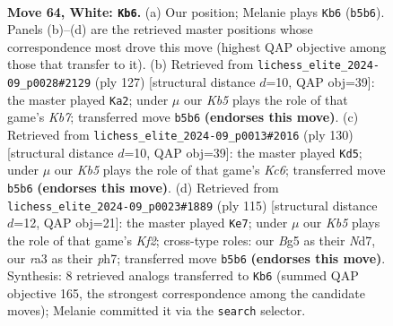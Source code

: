 \documentclass[11pt]{article}
\begin{document}
\clearpage

\begin{figure}[p]\centering
\begin{subfigure}{0.46\textwidth}\centering
\resizebox{\linewidth}{!}{%
\newchessgame
\chessboard[
  setfen={8/8/3k4/1K4Br/4q3/r7/8/8 w - - 0 64},
  showmover=false,
  pgfstyle=straightmove, color=movearrow, markmove={b5-b6}
]}
\caption{}
\end{subfigure}\hfill
\begin{subfigure}{0.46\textwidth}\centering
\resizebox{\linewidth}{!}{%
\newchessgame
\chessboard[
  setfen={8/8/8/8/1R6/1b6/1k1K4/8 b - - 1 64},
  showmover=false,
  pgfstyle=straightmove, color=movearrow, markmove={b2-a2}
]}
\caption{}
\end{subfigure}
\\[4pt]
\begin{subfigure}{0.46\textwidth}\centering
\resizebox{\linewidth}{!}{%
\newchessgame
\chessboard[
  setfen={3k4/7R/2KBr3/8/8/8/8/8 w - - 18 66},
  showmover=false,
  pgfstyle=straightmove, color=movearrow, markmove={c6-d5}
]}
\caption{}
\end{subfigure}\hfill
\begin{subfigure}{0.46\textwidth}\centering
\resizebox{\linewidth}{!}{%
\newchessgame
\chessboard[
  setfen={8/1R1n1k1P/8/5K2/8/8/8/b7 b - - 6 58},
  showmover=false,
  pgfstyle=straightmove, color=movearrow, markmove={f7-e7}
]}
\caption{}
\end{subfigure}
\caption{\textbf{Move 64, White: \texttt{Kb6}.} (a) Our position; Melanie plays \texttt{Kb6} (\texttt{b5b6}). Panels (b)--(d) are the retrieved master positions whose correspondence most drove this move (highest QAP objective among those that transfer to it). (b) Retrieved from \texttt{lichess\_elite\_2024-09\_p0028\#2129} (ply 127) [structural distance $d$=10, QAP obj=39]: the master played \texttt{Ka2}; under $\mu$ our \emph{Kb5} plays the role of that game's \emph{Kb7}; transferred move \texttt{b5b6} \textbf{(endorses this move)}. (c) Retrieved from \texttt{lichess\_elite\_2024-09\_p0013\#2016} (ply 130) [structural distance $d$=10, QAP obj=39]: the master played \texttt{Kd5}; under $\mu$ our \emph{Kb5} plays the role of that game's \emph{Kc6}; transferred move \texttt{b5b6} \textbf{(endorses this move)}. (d) Retrieved from \texttt{lichess\_elite\_2024-09\_p0023\#1889} (ply 115) [structural distance $d$=12, QAP obj=21]: the master played \texttt{Ke7}; under $\mu$ our \emph{Kb5} plays the role of that game's \emph{Kf2}; cross-type roles: our \emph{B}g5 as their \emph{N}d7, our \emph{r}a3 as their \emph{p}h7; transferred move \texttt{b5b6} \textbf{(endorses this move)}. Synthesis: 8 retrieved analogs transferred to \texttt{Kb6} (summed QAP objective 165, the strongest correspondence among the candidate moves); Melanie committed it via the \texttt{search} selector.}
\label{fig:thought-m126}
\end{figure}
\end{document}
